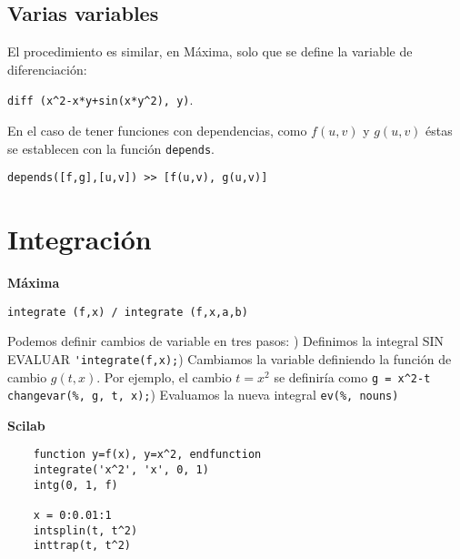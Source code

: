 \documentclass[a4paper]{article}
\begin{document}
\subsection{Varias variables}
El procedimiento es similar, en Máxima, solo que se define la variable de diferenciación:

\verb|diff (x^2-x*y+sin(x*y^2), y)|.


En el caso de tener funciones con dependencias, como $f(u,v)$ y $g(u,v)$ éstas se establecen con la función \verb|depends|.

\verb|depends([f,g],[u,v]) >> [f(u,v), g(u,v)]|

\section{Integración}
\begin{multicols}{2}
	\begin{center}
		\textbf{Máxima}
	\end{center}
	\verb|integrate (f,x) / integrate (f,x,a,b)|
	
	Podemos definir cambios de variable en tres pasos: ) Definimos la integral SIN EVALUAR\linebreak
	\verb|'integrate(f,x);|) Cambiamos la variable definiendo la función de cambio $g(t,x)$. Por ejemplo, el cambio $t = x^2$ se definiría como \verb|g = x^2-t|\linebreak
	\verb|changevar(%, g, t, x);|) Evaluamos la nueva integral\linebreak
	\verb|ev(%, nouns)|
	\columnbreak
	
	\begin{center}
		\textbf{Scilab}
	\end{center}
	\begin{verbatim}
	function y=f(x), y=x^2, endfunction
	integrate('x^2', 'x', 0, 1)
	intg(0, 1, f)
	
	x = 0:0.01:1
	intsplin(t, t^2)
	inttrap(t, t^2)
	\end{verbatim}

\end{multicols}
\end{document}
